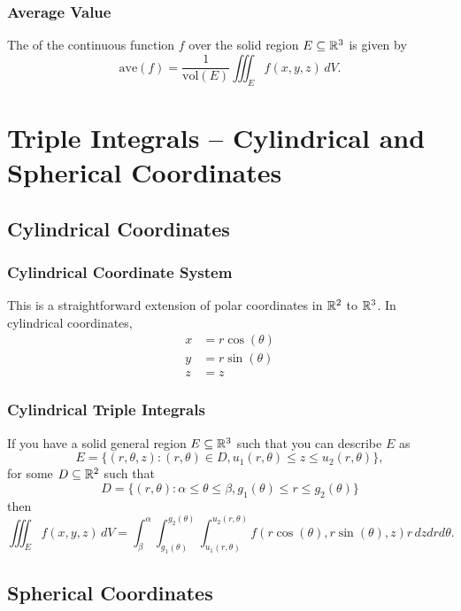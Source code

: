 \subsubsection{Average Value}

The  of the continuous function \(f\) over the solid region \(E \subseteq \mathbb{R}^3\) is given by
\[
  \text{ave}(f) = \frac{1}{\text{vol}(E)} \iiint_E f(x, y, z) \, dV.
\]

\newpage

\section{Triple Integrals -- Cylindrical and Spherical Coordinates}

\subsection{Cylindrical Coordinates}

\subsubsection{Cylindrical Coordinate System}

This is a straightforward extension of polar coordinates in \(\mathbb{R}^2\) to \(\mathbb{R}^3\). In cylindrical coordinates,
\begin{align*}
  x & = r \cos(\theta) \\
  y & = r \sin(\theta) \\
  z & = z
\end{align*}

\subsubsection{Cylindrical Triple Integrals}

If you have a solid general region \(E \subseteq \mathbb{R}^3\) such that you can describe \(E\) as
\[
  E = \{(r, \theta, z) : (r, \theta) \in D, u_1(r, \theta) \leq z \leq u_2(r, \theta)\},
\]
for some \(D \subseteq \mathbb{R}^2\) such that
\[
  D = \{(r, \theta) : \alpha \leq \theta \leq \beta, g_1(\theta) \leq r \leq g_2(\theta)\}
\]
then
\[
  \iiint_E f(x, y, z) \, dV = \int_{\beta}^{\alpha} \int_{g_1(\theta)}^{g_2(\theta)} \int_{u_1(r, \theta)}^{u_2(r, \theta)} f(r \cos(\theta), r \sin(\theta), z) r \, dz dr d\theta.
\]

\subsection{Spherical Coordinates}


